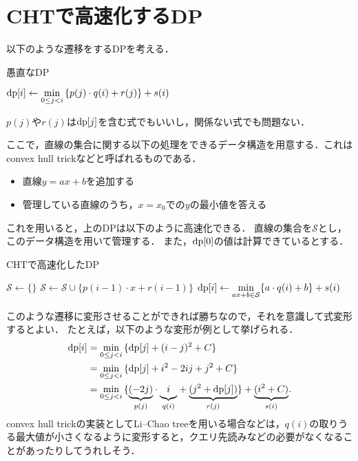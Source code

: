 \documentclass{jsarticle}
\newcommand{\DP}{\ensuremath\mathrm{dp}}
\begin{document}
\section{CHTで高速化するDP}

以下のような遷移をするDPを考える．
\begin{alg}
  \caption{愚直なDP}
  {
    {$\displaystyle\DP[i] \gets \min_{0\le j < i}\,\{p(j)\cdot q(i) + r(j)\} + s(i)$}\;
  }
\end{alg}

\noindent
$p(j)$や$r(j)$は$\DP[j]$を含む式でもいいし，関係ない式でも問題ない．

ここで，直線の集合に関する以下の処理をできるデータ構造を用意する．これはconvex hull trickなどと呼ばれるものである．
\begin{itemize}
\item 直線$y=ax+b$を追加する
\item 管理している直線のうち，$x=x_0$での$y$の最小値を答える
\end{itemize}

これを用いると，上のDPは以下のように高速化できる．
直線の集合を$\mathcal{S}$とし，このデータ構造を用いて管理する．
また，$\DP[0]$の値は計算できているとする．
\begin{alg}
  \caption{CHTで高速化したDP}
  {$\mathcal{S} \gets \{\}$}\;
  {
    {$\mathcal{S} \gets \mathcal{S} \cup \{p(i-1)\cdot x+r(i-1)\}$}\;
    {$\displaystyle\DP[i] \gets \min_{ax+b\in\mathcal{S}} \{a\cdot q(i)+b\}+s(i)$}\;
  }
\end{alg}

このような遷移に変形させることができれば勝ちなので，それを意識して式変形するとよい．
たとえば，以下のような変形が例として挙げられる．
\begin{align*}
  \DP[i]
  &= \min_{0\le j < i}\,\{\DP[j] + (i-j)^2 + C\}\\
  &= \min_{0\le j < i}\,\{\DP[j] + i^2-2ij+j^2+C\}\\
  &= \min_{0\le j < i}\,\{\underset{p(j)}{\underbrace{(-2j)}}\cdot \underset{q(i)}{\underbrace{\mathstrut i}} + \underset{r(j)}{\underbrace{(j^2+\DP[j])}}\} + \underset{s(i)}{\underbrace{(i^2+C)}}.
\end{align*}
convex hull trickの実装としてLi--Chao treeを用いる場合などは，$q(i)$の取りうる最大値が小さくなるように変形すると，クエリ先読みなどの必要がなくなることがあったりしてうれしそう．
\end{document}
